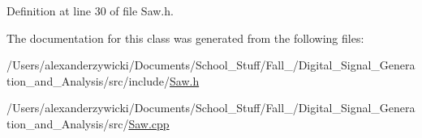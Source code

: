 Definition at line 30 of file Saw.\+h.



The documentation for this class was generated from the following files\+:\begin{DoxyCompactItemize}
\item 
/\+Users/alexanderzywicki/\+Documents/\+School\+\_\+\+Stuff/\+Fall\+\_/\+Digital\+\_\+\+Signal\+\_\+\+Generation\+\_\+and\+\_\+\+Analysis/src/include/\hyperlink{_saw_8h}{Saw.\+h}\item 
/\+Users/alexanderzywicki/\+Documents/\+School\+\_\+\+Stuff/\+Fall\+\_/\+Digital\+\_\+\+Signal\+\_\+\+Generation\+\_\+and\+\_\+\+Analysis/src/\hyperlink{_saw_8cpp}{Saw.\+cpp}\end{DoxyCompactItemize}
